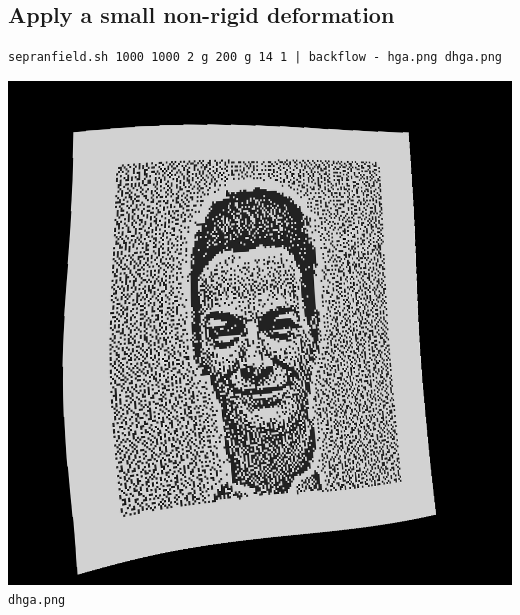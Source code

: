 \subsection{Apply a small non-rigid deformation}
\begin{verbatim}
sepranfield.sh 1000 1000 2 g 200 g 14 1 | backflow - hga.png dhga.png
\end{verbatim}
\includegraphics{dhga.png}\verb+dhga.png+


